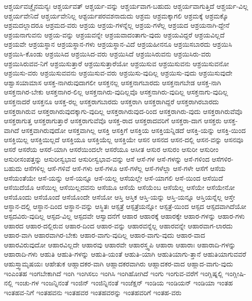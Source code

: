 {ಆಶ್ಚರ್ಯವಚ್ಚೈನಮನ್ಯಃ
ಆಶ್ಚರ್ಯವತ್
ಆಶ್ಚರ್ಯ-ವನ್ನು
ಆಶ್ಚರ್ಯವಾಗ-ಬಹುದು
ಆಶ್ಚರ್ಯವಾಗುತ್ತಿದೆ
ಆಶ್ಚರ್ಯ-ವಿಲ್ಲ
ಆಶ್ಚರ್ಯವೇನಿದೆ
ಆಶ್ಚರ್ಯವೇನಿಲ್ಲ
ಆಶ್ಟರ್ಯಪರವಶನಾದುದು
ಆಶ್ರಮ
ಆಶ್ರಮಕ್ಕಾಗಲಿ
ಆಶ್ರಮಕ್ಕೆ
ಆಶ್ರಮಕ್ಕೊ
ಆಶ್ರಮದಲ್ಲಾದರೂ
ಆಶ್ರಮದ-ವರು
ಆಶ್ರಯ
ಆಶ್ರಯ-ಗಳನ್ನೆಲ್ಲ
ಆಶ್ರಯ-ಗಳೆಲ್ಲ
ಆಶ್ರಯದ
ಆಶ್ರಯನಾಗಿ-ದ್ದೇನೆ
ಆಶ್ರಯನಾಗುವನು
ಆಶ್ರಯ-ವನ್ನು
ಆಶ್ರಯವನ್ನೇ
ಆಶ್ರಯವಾದಂತಾಗು-ವುದು
ಆಶ್ರಯವಿದ್ದರೆ
ಆಶ್ರಯವಿಲ್ಲದೆ
ಆಶ್ರಯವೇ
ಆಶ್ರಯಸ್ಥಾನ
ಆಶ್ರಯಸ್ಥಾನ-ಗಳು
ಆಶ್ರಯಸ್ಥಾನ-ವಿದೆ
ಆಶ್ರಯಹೀನನೂ
ಆಶ್ರಯಿಸಬಾರದು
ಆಶ್ರಯಿಸಿ
ಆಶ್ರಯಿಸಿ-ಕೊಂಡು
ಆಶ್ರಯಿಸಿದ
ಆಶ್ರಯಿಸಿದ-ವರು
ಆಶ್ರಯಿಸಿದೆ
ಆಶ್ರಯಿಸಿರುವನು
ಆಶ್ರಯಿಸಿರು-ವರು
ಆಶ್ರಯಿಸಿರುವವ-ನಿಗೆ
ಆಶ್ರಯಿಸುತ್ತಾರೆ
ಆಶ್ರಯಿಸುತ್ತಾರೆಯೋ
ಆಶ್ರಯಿಸುವ
ಆಶ್ರಯಿಸುವನು
ಆಶ್ರಯಿಸುವನೋ
ಆಶ್ರಯಿಸು-ವರು
ಆಶ್ರಯಿಸುವವನು
ಆಶ್ರಯಿಸುವ-ವರು
ಆಶ್ರಯಿಸು-ವುದಿಲ್ಲ
ಆಶ್ರಯಿಸು-ವುದು
ಆಶ್ರಯಿಸುವುದೇ
ಆಶ್ವಾಸಯಾಮಾಸ
ಆಸಕ್ತ-ನಾಗಿರುವುದಾಗಲೀ
ಆಸಕ್ತನಲ್ಲ
ಆಸಕ್ತನಾಗಬಾರದು
ಆಸಕ್ತನಾಗಬೇಡ
ಆಸಕ್ತ-ನಾಗಿ
ಆಸಕ್ತನಾಗಿರ-ಬೇಕು
ಆಸಕ್ತನಾಗಿರ-ಲಿಲ್ಲ
ಆಸಕ್ತನಾಗಿರು-ವುದಿಲ್ಲವೊ
ಆಸಕ್ತನಾಗಿರು-ವುದಿಲ್ಲ
ಆಸಕ್ತನಾಗು-ವುದಿಲ್ಲ
ಆಸಕ್ತನಾದರೆ
ಆಸಕ್ತನೂ
ಆಸಕ್ತ-ರಲ್ಲ
ಆಸಕ್ತರಾಗಬಾರದು
ಆಸಕ್ತರಾಗಿ
ಆಸಕ್ತರಾಗಿದ್ದರೆ
ಆಸಕ್ತರಾಗಿರಬಾರದು
ಆಸಕ್ತರಾಗಿರುವ
ಆಸಕ್ತರಾಗಿರುವುದಕ್ಕಾಗು-ವುದಿಲ್ಲ
ಆಸಕ್ತರಾಗಿರುವುದ-ರಿಂದ
ಆಸಕ್ತರಾಗಿರು-ವುದು
ಆಸಕ್ತರಾಗಿರುವೆವೊ
ಆಸಕ್ತರಾಗುತ್ತ
ಆಸಕ್ತರಾಗುತ್ತಾರೆ
ಆಸಕ್ತರಾಗುವೆವೊ
ಆಸಕ್ತ-ರಾದ
ಆಸಕ್ತರಾದವರಿಗೆ
ಆಸಕ್ತರಾ-ದಾಗ
ಆಸಕ್ತರು
ಆಸಕ್ತ-ವಾಗಿದೆ
ಆಸಕ್ತವಾಗಿರುವುದೋ
ಆಸಕ್ತವಾಗಿಲ್ಲ
ಆಸಕ್ತಿ
ಆಸಕ್ತಿಗೆ
ಆಸಕ್ತಿಯ
ಆಸಕ್ತಿಯನ್ನಿಡದೆ
ಆಸಕ್ತಿ-ಯನ್ನು
ಆಸಕ್ತಿ-ಯಿಂದ
ಆಸಕ್ತಿಯಿಲ್ಲ
ಆಸಕ್ತಿಯಿಲ್ಲದೆ
ಆಸಕ್ತಿಯೂ
ಆಸಕ್ತಿಯೆಲ್ಲ
ಆಸಕ್ತಿಯೇ
ಆಸನ
ಆಸನದ
ಆಸನ-ದಲ್ಲಿ
ಆಸನ-ವನ್ನು
ಆಸನವೂ
ಆಸರೆ
ಆಸರೆಯ
ಆಸರೆ-ಯಾಗಿ
ಆಸರೆಯಿಂದಲೇ
ಆಸರೆಯೂ
ಆಸೀತ
ಆಸುರ
ಆಸುರಂ
ಆಸುರೀ
ಆಸುರೀಂ
ಆಸುರೀಸಂಪತ್ತನ್ನು
ಆಸುರೀಸ್ವಭಾವ
ಆಸುರೀಸ್ವಭಾವ-ವನ್ನು
ಆಸೆ
ಆಸೆ-ಗಳ
ಆಸೆ-ಗಳನ್ನು
ಆಸೆ-ಗಳಿಂದ
ಆಸೆಗಳಿರ-ಬಹುದು
ಆಸೆಗಳಿಲ್ಲ
ಆಸೆ-ಗಳಿವೆ
ಆಸೆ-ಗಳು
ಆಸೆ-ಗಳೂ
ಆಸೆ-ಗಳೆಲ್ಲ
ಆಸೆ-ಗಳೆಲ್ಲಾ
ಆಸೆ-ಗಳೇ
ಆಸೆಗೆ
ಆಸೆಯ
ಆಸೆಯಂತೆಯೇ
ಆಸೆ-ಯನ್ನು
ಆಸೆ-ಯನ್ನೂ
ಆಸೆ-ಯಲ್ಲ
ಆಸೆಯಲ್ಲೇ
ಆಸೆ-ಯಾಗಲಿ
ಆಸೆ-ಯಿಂದ
ಆಸೆಯಿದೆ
ಆಸೆಯಿದೆಯೊ
ಆಸೆಯಿಲ್ಲ
ಆಸೆಯಿಲ್ಲದವನು
ಆಸೆಯೂ
ಆಸೆಯೆ
ಆಸೆಯೆಂಬ
ಆಸೆಯೆಲ್ಲ
ಆಸೆಯೇ
ಆಸೆಯೇನೋ
ಆಸೆಯೊಂದು
ಆಸೆಯೊಂದೆ
ಆಸೆಯೊಂದೇ
ಆಸೆಯೋ
ಆಸ್ತಿ
ಆಸ್ತಿಕ
ಆಸ್ತಿ-ಯನ್ನು
ಆಸ್ತಿ-ಯನ್ನೂ
ಆಸ್ತಿಯನ್ನೆಲ್ಲ
ಆಸ್ತೇ
ಆಸ್ಥಾನ-ದಲ್ಲಿ
ಆಸ್ಥಾನ-ದಿಂದ
ಆಸ್ಥಾನ-ವನ್ನು
ಆಸ್ಥಿತಃ
ಆಸ್ಪತ್ರೆ
ಆಸ್ಪತ್ರೆಯನ್ನೋ
ಆಸ್ಪತ್ರೆ-ಯಿಂದ
ಆಸ್ಪದ
ಆಸ್ಪದವಾಗಿದೆಯೋ
ಆಸ್ಪದವಿರು-ವುದಿಲ್ಲ
ಆಸ್ಪದ-ವಿಲ್ಲ
ಆಸ್ಪದವೇ
ಆಸ್ವಾದನೆಗೆ
ಆಹಾರ
ಆಹಾರಕ್ಕೆ
ಆಹಾರಕ್ಕೇ
ಆಹಾರ-ಗಳನ್ನು
ಆಹಾರ-ಗಳು
ಆಹಾರದ
ಆಹಾರ-ದಲ್ಲಿರುವ
ಆಹಾರ-ದಿಂದ
ಆಹಾರ-ವನ್ನು
ಆಹಾರವನ್ನೆಲ್ಲ
ಆಹಾರವನ್ನೇ
ಆಹಾರವಾಗ-ಲಾರದು
ಆಹಾರ-ವಾಗಿ
ಆಹಾರವಾಗಿರ-ಬೇಕು
ಆಹಾರ-ವಾಗು-ವುದಿಲ್ಲ
ಆಹಾರ-ವಾಗು-ವುದು
ಆಹಾರ-ವಾದ
ಆಹಾರವಿರುವುದೋ
ಆಹಾರವಿಲ್ಲದೇ
ಆಹಾರವು
ಆಹಾರವೇ
ಆಹಾರಸ್ತ್ವಪಿ
ಆಹಾರಾ
ಆಹಾರಾಃ
ಆಹಾರಾದಿ-ಗಳನ್ನು
ಆಹಾರಾದಿ-ಗಳು
ಆಹುತಿ
ಆಹುತಿ-ಗಳನ್ನು
ಆಹುತಿ-ಯಂತೆ
ಆಹುತಿ-ಯಾಗಿ
ಆಹುತಿಯಾಗು-ತ್ತಾನೆ
ಆಹುತಿಯಾಗುವವರೆ
ಆಹುಸ್ತ್ವಾಮೃಷಯಃ
ಆಹೇತುಕ
ಆಹ್ಲಾದಕರ-ವಾಗಿ
ಆಹ್ಲಾದಕರವಾಗಿರು
ಆಹ್ಲಾದಕರ-ವಾದ
ಆಹ್ಲಾದ-ವಾಗು-ವುದು
ಇಂಎಂತಹ
ಇಂಗಬೇಕಾಗಿದೆ
ಇಂಗಿ
ಇಂಗಿಸಲು
ಇಂಗಿಸಿ
ಇಂಗಿಹೋಗಿದೆ
ಇಂಗು
ಇಂಗುವ-ವರೆಗೆ
ಇಂಗ್ಲಿಷ್ನಲ್ಲಿ
ಇಂಗ್ಲೀಷಿ-ನಲ್ಲಿ
ಇಂಚು-ಗಳ
ಇಂಜನ್ನಿನಂತೆ
ಇಂಜಿನ್
ಇಂಜಿನ್ನಿನಂತೆ
ಇಂಜೆಕ್ಷನ್
ಇಂಡಿಯ
ಇಂಡಿಯನ್
ಇಂಡಿಯಾ
ಇಂತಹ
ಇಂತಹವ-ನಿಗೆ
ಇಂತಹವನು
ಇಂತಹವರ
ಇಂತಹವರನ್ನು
ಇಂತಹವರಿಗೆ
ಇಂತಹ-ವರು
}

